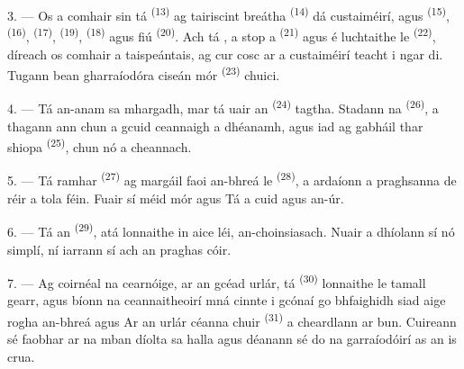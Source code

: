 3. --- Os a comhair sin tá  \textsuperscript{(13)} ag
tairiscint  breátha \textsuperscript{(14)} dá custaiméirí, agus
 \textsuperscript{(15)},  \textsuperscript{(16)},
 \textsuperscript{(17)}, 
\textsuperscript{(19)},  \textsuperscript{(18)} agus fiú
 \textsuperscript{(20)}. Ach tá , a stop a
 \textsuperscript{(21)} agus é luchtaithe le  \textsuperscript{(22)}, díreach os comhair a taispeántais, ag cur cosc ar a
custaiméirí teacht i ngar di. Tugann bean gharraíodóra ciseán mór 
\textsuperscript{(23)} chuici.

\VUsaut{4.0mm}
\VUsaut{3.0mm}

4. --- Tá an-anam sa mhargadh, mar tá uair an  \textsuperscript{(24)}
tagtha. Stadann na  \textsuperscript{(26)}, a thagann ann chun a gcuid
ceannaigh a dhéanamh, agus iad ag gabháil thar shiopa 
\textsuperscript{(25)}, chun  nó  a
cheannach.

5. --- Tá  ramhar \textsuperscript{(27)} ag margáil faoi
 an-bhreá le  \textsuperscript{(28)}, a
ardaíonn a praghsanna de réir a tola féin. Fuair sí méid mór  agus  Tá a cuid  agus 
an-úr.

\VUsaut{4.0mm}
\VUsaut{3.0mm}

6. --- Tá an  \textsuperscript{(29)}, atá lonnaithe in
aice léi, an-choinsiasach. Nuair a dhíolann sí  nó
 simplí, ní iarrann sí ach an praghas cóir.

7. --- Ag coirnéal na cearnóige, ar an gcéad urlár, tá 
\textsuperscript{(30)} lonnaithe le tamall gearr, agus bíonn na ceannaitheoirí mná
cinnte i gcónaí go bhfaighidh siad aige rogha an-bhreá  agus  Ar an urlár céanna chuir
 \textsuperscript{(31)} a cheardlann ar bun. Cuireann sé faobhar ar
 na mban díolta sa halla agus déanann sé  do na
garraíodóirí as an  is crua.

